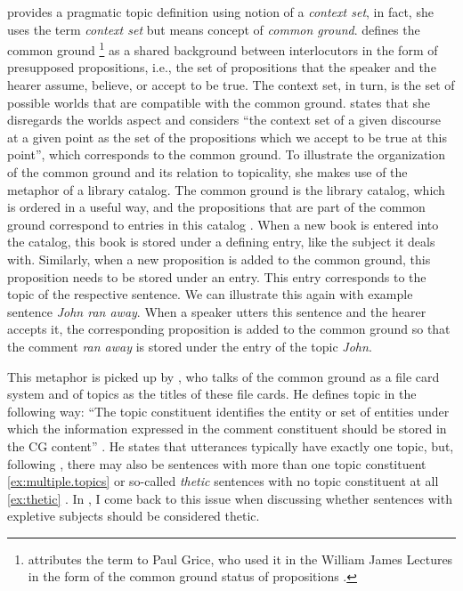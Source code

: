 \citet{reinhart1981} provides a pragmatic topic definition using  notion of a \textit{context set}, in fact, she uses the term \textit{context set} but means  concept of \textit{common ground}. 
\citet{stalnaker1974, stalnaker1978, stalnaker2002} defines the common ground%
\footnote{\citet{stalnaker1978, stalnaker2002} attributes the term to Paul Grice, who used it in the William James Lectures in the form of the common ground  status of propositions \citep{grice1989}.}
%
as a shared background between interlocutors in the form of presupposed propositions, i.e., the set of propositions that the speaker and the hearer assume, believe, or accept to be true.
The context set, in turn, is the set of possible worlds that are compatible with the common ground. 
\citet[78--79]{reinhart1981} states that she disregards the worlds aspect and considers ``the context set of a given discourse at a given point as the set of the propositions which we accept to be true at this point'',  which corresponds to the common ground. 
To illustrate the organization of the common ground and its relation to topicality, she makes use of the metaphor of a library catalog.
The common ground is the library catalog, which is ordered in a useful way, and the propositions that are part of the common ground correspond to entries in this catalog \citep[79--80]{reinhart1981}.
When a new book is entered into the catalog, this book is stored under a defining entry, like the subject it deals with.
Similarly, when a new proposition is added to the common ground, this proposition needs to be stored under an entry.
This entry corresponds to the topic of the respective sentence.
We can illustrate this again with  example sentence \textit{John ran away}.
When a speaker utters this sentence and the hearer accepts it, the corresponding proposition is added to the common ground  so that the comment \textit{ran away} is stored under the entry of the topic \textit{John}.

\largerpage
This metaphor is picked up by \citet{krifka2007}, who talks of the common ground  as a file card system and of topics as the titles of these file cards.
He defines topic in the following way:
``The topic constituent identifies the entity or set of entities under which the information expressed in the comment constituent should be stored in the CG content'' \citep[41]{krifka2007}.
He states that utterances typically have exactly one topic, but, following \citet{lambrecht1994}, there may also be sentences with more than one topic constituent \ref{ex:multiple.topics} or so-called \textit{thetic} sentences with no topic constituent at all \ref{ex:thetic} \citep[42--43]{krifka2007}.
In , I come back to this issue when discussing whether sentences with expletive subjects should be considered thetic.

